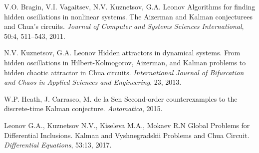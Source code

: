 \documentclass{ifacconf}
\theoremstyle{plain}
\begin{document}
\begin{thebibliography}{xx}
 V.O. Bragin, V.I. Vagaitsev, N.V. Kuznetsov, G.A. Leonov
 \newblock Algorithms for finding hidden oscillations in nonlinear systems. The Aizerman and Kalman conjecturees and Chua's circuits.
 \newblock \emph{Journal of Computer and Systems Sciences International}, 50:4, 511--543, 2011.

 N.V. Kuznetsov, G.A. Leonov
 \newblock Hidden attractors in dynamical systems. From hidden oscillations in Hilbert-Kolmogorov, Aizerman, and Kalman problems to hidden chaotic attractor in Chua circuits.
 \newblock \emph{International Journal of Bifurcation and Chaos in Applied Sciences and Engineering}, 23, 2013.

 W.P. Heath, J. Carrasco, M. de la Sen
 \newblock Second-order counterexamples to the discrete-time Kalman conjecture.
 \newblock \emph{Automatica}, 2015.

 Leonov G.A., Kuznetsov N.V., Kiseleva M.A., Mokaev R.N
 \newblock Global Problems for Differential Inclusions. Kalman and Vyshnegradskii Problems and Chua Circuit.
 \newblock \emph{Differential Equations}, 53:13, 2017.

 \end{thebibliography}

\end{document}
